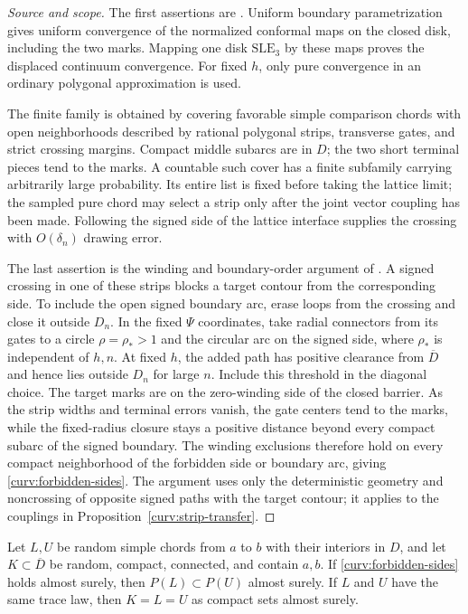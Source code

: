 \begin{proof}[Source and scope]
The first assertions are
\cite[Section~7, ``From fixed strip tests to limiting barriers'']{S}.
Uniform boundary parametrization gives uniform convergence of the
normalized conformal maps on the closed disk, including the two marks.
Mapping one disk $\mathrm{SLE}_3$ by these maps proves the displaced
continuum convergence.  For fixed $h$, only pure convergence in an
ordinary polygonal approximation is used.

The finite family is obtained by covering favorable simple comparison
chords with open neighborhoods described by rational polygonal strips,
transverse gates, and strict crossing margins.  Compact middle subarcs
are in $D$; the two short terminal pieces tend to the marks.  A
countable such cover has a finite subfamily carrying arbitrarily large
probability.  Its entire list is fixed before taking the lattice limit;
the sampled pure chord may select a strip only after the joint vector
coupling has been made.  Following the signed side of the lattice
interface supplies the crossing with $O(\delta_n)$ drawing error.

The last assertion is the winding and boundary-order argument of
\cite[Section~7, ``Forbidden sides, order, and identification of the
trace'']{S}.  A signed crossing in one of these strips blocks a target
contour from the corresponding side.  To include the open signed
boundary arc, erase loops from the crossing and close it outside $D_n$.
In the fixed $\Psi$ coordinates, take radial connectors from its gates
to a circle $\rho=\rho_*>1$ and the circular arc on the signed side,
where $\rho_*$ is independent of $h,n$.  At fixed $h$, the added path
has positive clearance from $\overline D$ and hence lies outside $D_n$
for large $n$.  Include this threshold in the diagonal choice.  The
target marks are on the zero-winding side of the closed barrier.  As
the strip widths and terminal errors vanish, the gate centers tend
to the marks, while the fixed-radius closure stays a positive distance
beyond every compact subarc of the signed boundary.  The winding
exclusions therefore hold on every compact neighborhood of the
forbidden side or boundary arc, giving
\eqref{curv:forbidden-sides}.  The argument uses only the deterministic
geometry and noncrossing of opposite signed paths with the target
contour; it applies to the couplings in
Proposition~\ref{curv:strip-transfer}.
\end{proof}

\begin{lemma}
\label{curv:ordered-chords}
Let $L,U$ be random simple chords from $a$ to $b$ with their interiors
in $D$, and let $K\subset\overline D$ be random, compact, connected,
and contain $a,b$.  If \eqref{curv:forbidden-sides} holds almost surely,
then $P(L)\subset P(U)$ almost surely.  If $L$ and $U$ have the same
trace law, then $K=L=U$ as compact sets almost surely.
\end{lemma}

